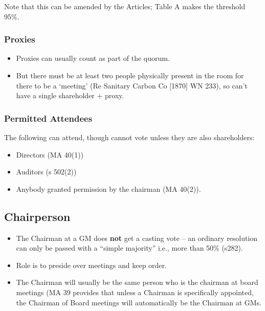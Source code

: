 \documentclass[
]{article}
\providecommand{\tightlist}{%
  \setlength{\itemsep}{0pt}\setlength{\parskip}{0pt}}
\begin{document}
Note that this can be amended by the Articles; Table A makes the
threshold 95\%.

\hypertarget{proxies}{%
\subsubsection{Proxies}\label{proxies}}

\begin{itemize}
\tightlist
\item
  Proxies can usually count as part of the quorum.
\item
  But there must be at least two people physically present in the room
  for there to be a `meeting' (Re Sanitary Carbon Co {[}1870{]} WN 233),
  so can't have a single shareholder + proxy.
\end{itemize}

\hypertarget{permitted-attendees}{%
\subsubsection{Permitted Attendees}\label{permitted-attendees}}

The following can attend, though cannot vote unless they are also
shareholders:

\begin{itemize}
\tightlist
\item
  Directors (MA 40(1))
\item
  Auditors (s 502(2))
\item
  Anybody granted permission by the chairman (MA 40(2)).
\end{itemize}

\hypertarget{chairperson-1}{%
\subsection{Chairperson}\label{chairperson-1}}

\begin{itemize}
\tightlist
\item
  The Chairman at a GM does \textbf{not} get a casting vote -- an
  ordinary resolution can only be passed with a ``simple majority''
  i.e., more than 50\% (s282).
\item
  Role is to preside over meetings and keep order.
\item
  The Chairman will usually be the same person who is the chairman at
  board meetings (MA 39 provides that unless a Chairman is specifically
  appointed, the Chairman of Board meetings will automatically be the
  Chairman at GMs.
\end{itemize}
\end{document}
